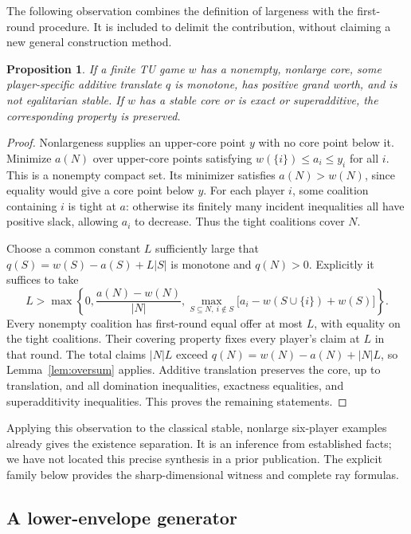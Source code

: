 \documentclass[11pt]{article}
\newtheorem{proposition}[theorem]{Proposition}
\begin{document}
The following observation combines the definition of largeness with the
first-round procedure. It is included to delimit the contribution, without
claiming a new general construction method.

\begin{proposition}\label{prop:classical-synthesis}
If a finite TU game $w$ has a nonempty, nonlarge core, some player-specific
additive translate $q$ is monotone, has positive grand worth, and is not
egalitarian stable. If $w$ has a stable core or is exact or superadditive,
the corresponding property is preserved.
\end{proposition}
\begin{proof}
Nonlargeness supplies an upper-core point $y$ with no core point below it.
Minimize $a(N)$ over upper-core points satisfying
$w(\{i\})\le a_i\le y_i$ for all $i$. This is a nonempty compact set.
Its minimizer satisfies $a(N)>w(N)$, since equality would give a core point
below $y$. For each player $i$, some coalition containing $i$ is tight at
$a$: otherwise its finitely many incident inequalities all have positive
slack, allowing $a_i$ to decrease. Thus the tight coalitions cover $N$.

Choose a common constant $L$ sufficiently large that
$q(S)=w(S)-a(S)+L|S|$ is monotone and $q(N)>0$.
Explicitly it suffices to take
\[
 L>\max\left\{0,\frac{a(N)-w(N)}{|N|},
 \max_{S\subseteq N,\ i\notin S}
    \bigl[a_i-w(S\cup\{i\})+w(S)\bigr]\right\}.
\]
Every nonempty coalition has first-round equal offer at most $L$, with
equality on the tight coalitions. Their covering property fixes every
player's claim at $L$ in that round. The total claims $|N|L$ exceed
$q(N)=w(N)-a(N)+|N|L$, so Lemma~\ref{lem:oversum} applies.
Additive translation preserves the core, up to translation, and all
domination inequalities, exactness equalities, and superadditivity
inequalities. This proves the remaining statements.
\end{proof}

Applying this observation to the classical stable, nonlarge six-player
examples \citep{Biswas2001,Shellshear2009} already gives the existence
separation. It is an inference from established facts; we have not located
this precise synthesis in a prior publication. The explicit family below
provides the sharp-dimensional witness and complete ray formulas.

\subsection{A lower-envelope generator}
\end{document}
